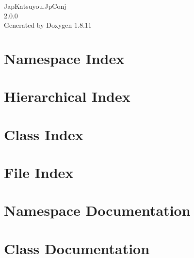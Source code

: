 \documentclass[twoside]{book}
\newcommand{\+}{\discretionary{\mbox{\scriptsize$\hookleftarrow$}}{}{}}
\newcommand{\clearemptydoublepage}{%
  \newpage{\pagestyle{empty}\cleardoublepage}%
}
\begin{document}
\hypersetup{pageanchor=false,
             bookmarksnumbered=true,
             pdfencoding=unicode
            }
\begin{titlepage}
\vspace*{7cm}
\begin{center}%
{\Large Jap\+Katsuyou.\+Jp\+Conj \\[1ex]\large 2.\+0.\+0 }\\
\vspace*{1cm}
{\large Generated by Doxygen 1.8.11}\\
\end{center}
\end{titlepage}
\clearemptydoublepage
\tableofcontents
\clearemptydoublepage
{}
\hypersetup{pageanchor=true}

\chapter{Namespace Index}

\chapter{Hierarchical Index}

\chapter{Class Index}

\chapter{File Index}

\chapter{Namespace Documentation}


\chapter{Class Documentation}































\end{document}
